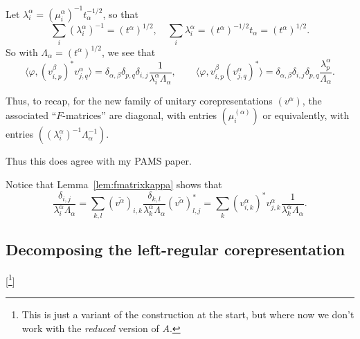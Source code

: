 \documentclass[twoside,a4paper,12pt]{article}
\theoremstyle{plain}
\theoremstyle{definition}
\newcommand{\ip}[2]{\langle #1,#2 \rangle}
\begin{document}
Let $\lambda^\alpha_i = (\mu^\alpha_i)^{-1} t_\alpha^{-1/2}$, so that
\[ \sum_i (\lambda^\alpha_i)^{-1} = (t^\alpha)^{1/2}, \quad
\sum_i \lambda^\alpha_i = (t^\alpha)^{-1/2} t_\alpha = (t^\alpha)^{1/2}. \]
So with $\Lambda_\alpha = (t^\alpha)^{1/2}$, we see that
\[ \ip{\varphi}{(v^\beta_{i,p})^* v^\alpha_{j,q}}
= \delta_{\alpha,\beta} \delta_{p,q} \delta_{i,j}
\frac{1}{\lambda^{\alpha}_i \Lambda_\alpha}, \qquad
\ip{\varphi}{v^\beta_{i,p} (v^\alpha_{j,q})^*}
= \delta_{\alpha,\beta} \delta_{i,j} \delta_{p,q}
\frac{\lambda^\alpha_p}{\Lambda_\alpha}. \]

Thus, to recap, for the new family of unitary corepresentations $(v^\alpha)$,
the associated ``$F$-matrices'' are diagonal, with entries $(\mu^{(\alpha)}_i)$
or equivalently, with entries $( (\lambda^{\alpha}_i)^{-1} \Lambda_\alpha^{-1} )$.

Thus this does agree with my PAMS paper.

Notice that Lemma~\ref{lem:fmatrixkappa} shows that
\[ \frac{\delta_{i,j}}{\lambda^\alpha_i \Lambda_\alpha}
= \sum_{k,l} (\overline{v^\alpha})_{i,k}
\frac{\delta_{k,l}}{\lambda^\alpha_k \Lambda_\alpha}
(\overline{v^\alpha})^*_{l,j}
= \sum_k (v^\alpha_{i,k})^* v^\alpha_{j,k}
\frac{1}{\lambda^\alpha_k \Lambda_\alpha}. \]


\subsection{Decomposing the left-regular corepresentation}

[\footnote{This is just a variant of the construction at the start,
but where now we don't work with the \emph{reduced} version of $A$.}]
\end{document}
